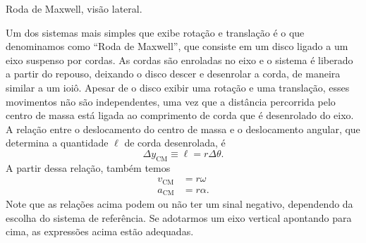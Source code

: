 \begin{marginfigure}[1.5cm]
\centering
{}
\caption{Roda de Maxwell, visão lateral.\label{Fig:RodaDeMaxwellVisaoLateral}}
\end{marginfigure}

Um dos sistemas mais simples que exibe rotação e translação é o que denominamos como ``Roda de Maxwell'', que consiste em um disco ligado a um eixo suspenso por cordas. As cordas são enroladas no eixo e o sistema é liberado a partir do repouso, deixando o disco descer e desenrolar a corda, de maneira similar a um ioiô. Apesar de o disco exibir uma rotação e uma translação, esses movimentos não são independentes, uma vez que a distância percorrida pelo centro de massa está ligada ao comprimento de corda que é desenrolado do eixo. A relação entre o deslocamento do centro de massa e o deslocamento angular, que determina a quantidade $\ell$ de corda desenrolada, é
\begin{equation}
    \Delta y_{\text{CM}} \equiv \ell = r \Delta \theta.
\end{equation}
%
A partir dessa relação, também temos
\begin{align}
    v_{\text{CM}} &= r \omega \\
    a_{\text{CM}} &= r \alpha.
\end{align}
%
Note que as relações acima podem ou não ter um sinal negativo, dependendo da escolha do sistema de referência. Se adotarmos um eixo vertical apontando para cima, as expressões acima estão adequadas.

